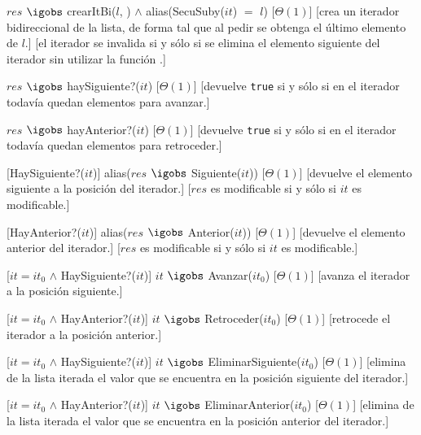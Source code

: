 \begin{Interfaz}
  {$res$ $\igobs$ crearItBi($l$, \secuencia{}) $\land$ alias(SecuSuby($it$) $=$ $l$)}
  [$\Theta(1)$]
  [crea un iterador bidireccional de la lista, de forma tal que al pedir  se obtenga el último elemento de $l$.]  
  [el iterador se invalida si y sólo si se elimina el elemento siguiente del iterador sin utilizar la función .]

  {$res$ $\igobs$ haySiguiente?($it$)}
  [$\Theta(1)$]
  [devuelve \texttt{true} si y sólo si en el iterador todavía quedan elementos para avanzar.]

  {$res$ $\igobs$ hayAnterior?($it$)}
  [$\Theta(1)$]
  [devuelve \texttt{true} si y sólo si en el iterador todavía quedan elementos para retroceder.]

  [HaySiguiente?($it$)]
  {alias($res$ $\igobs$ Siguiente($it$))}
  [$\Theta(1)$]
  [devuelve el elemento siguiente a la posición del iterador.]
  [$res$ es modificable si y sólo si $it$ es modificable.]

  [HayAnterior?($it$)]
  {alias($res$ $\igobs$ Anterior($it$))}
  [$\Theta(1)$]
  [devuelve el elemento anterior del iterador.]
  [$res$ es modificable si y sólo si $it$ es modificable.]

  [$it = it_0$ $\land$ HaySiguiente?($it$)]
  {$it$ $\igobs$ Avanzar($it_0$)}
  [$\Theta(1)$]
  [avanza el iterador a la posición siguiente.]

  [$it = it_0$ $\land$ HayAnterior?($it$)]
  {$it$ $\igobs$ Retroceder($it_0$)}
  [$\Theta(1)$]
  [retrocede el iterador a la posición anterior.]

  [$it = it_0$ $\land$ HaySiguiente?($it$)]
  {$it$ $\igobs$ EliminarSiguiente($it_0$)}
  [$\Theta(1)$]
  [elimina de la lista iterada el valor que se encuentra en la posición siguiente del iterador.]

  [$it = it_0$ $\land$ HayAnterior?($it$)]
  {$it$ $\igobs$ EliminarAnterior($it_0$)}
  [$\Theta(1)$]
  [elimina de la lista iterada el valor que se encuentra en la posición anterior del iterador.]


\end{Interfaz}
